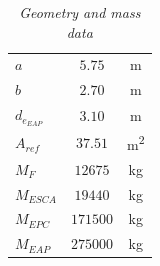 \documentclass[12pt,fleqn,openany]{book} %
\begin{document}
\begin{table}[h]
\begin{tabular}{ l c c}
		$a$										&$5.75$            &\si{\meter}        \\
		$b$                                     &$2.70$            &\si{\meter}        \\
		$d_{e_{EAP}}$ 								&$3.10$     	   &\si{\meter}        \\
		$A_{ref}$								&$37.51$		   &\si{\meter\squared}\\
		$M_F  		$							&$12675 $          &\si{\kilogram}     \\
		$M_{ESCA } 	$							&$19440 $          &\si{\kilogram}     \\
		$M_{EPC  }	$								&$171500$      &\si{\kilogram}     \\
		$M_{EAP  }	$								&$275000$      &\si{\kilogram}     \\
		\bottomrule
	\end{tabular} 
	\caption{\emph{Geometry and mass data}}
	\label{tab:gmdata}
\end{table}
\end{document}
